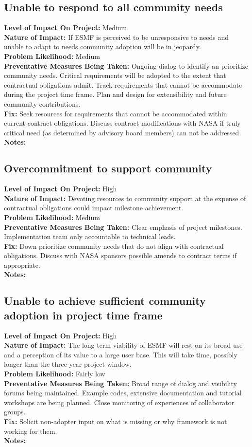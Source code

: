 \documentclass[english]{article}
\newcommand{\sreq}[1]{\subsection{\hspace{.2in}#1}}
\newenvironment
{reqlist}
{\begin{list} {} {} \rm \item[]}
{\end{list}}
\begin{document}
\sreq{Unable to respond to all community needs}
\begin{reqlist}
{\bf Level of Impact On Project:}  Medium \\
{\bf Nature of Impact:} If ESMF is perceived to be unresponsive to needs and unable to adapt to needs community adoption
will be in jeopardy.\\
{\bf Problem Likelihood:} Medium \\
{\bf Preventative Measures Being Taken:} Ongoing dialog to identify an prioritize
community needs. Critical requirements will be adopted to the extent
that contractual obligations admit. Track requirements that cannot be accommodate during the
project time frame. Plan and design for extensibility and future community contributions.\\
{\bf Fix:} Seek resources for requirements that cannot be accommodated within current
contract obligations. Discuss contract modifications with NASA if truly critical
need (as determined by advisory board members) can not be addressed. \\
{\bf Notes:} \\
\end{reqlist}

\sreq{Overcommitment to support community}
\begin{reqlist}
{\bf Level of Impact On Project:} High \\
{\bf Nature of Impact:} Devoting resources to community support at the expense of contractual obligations
could impact milestone achievement.\\
{\bf Problem Likelihood:} Medium \\
{\bf Preventative Measures Being Taken:} Clear emphasis of project milestones. Implementation
team only accountable to technical leads.\\
{\bf Fix:} Down prioritize community needs that do not align with contractual obligations.
Discuss with NASA sponsors possible amends to contract terms if appropriate.\\
{\bf Notes:} \\
\end{reqlist}

\sreq{Unable to achieve sufficient community adoption in project time frame}
\begin{reqlist}
{\bf Level of Impact On Project:}  High \\
{\bf Nature of Impact:} The long-term viability of ESMF will rest on its broad use and a perception of
its value to a large user base. This will take time, possibly longer
than the three-year project window.\\
{\bf Problem Likelihood:} Fairly low \\
{\bf Preventative Measures Being Taken:} Broad range of dialog and visibility 
forums being maintained. Example codes, extensive documentation and tutorial
workshops are being planned.
Close monitoring of experiences of collaborator groups.  \\
{\bf Fix:} Solicit non-adopter input on what is missing or why framework is not working for them.\\
{\bf Notes:} \\
\end{reqlist}
\end{document}
